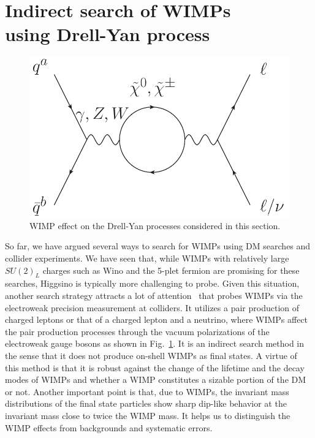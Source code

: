 \documentclass[12pt,twoside,book]{article}
\begin{document}
\section[Indirect search of WIMPs using Drell-Yan process]{
  Indirect search of WIMPs\\
  using Drell-Yan process
}
\setcounter{equation}{0}

\begin{figure}[b]
  \centering
  \includegraphics[width=0.5\hsize]{NC_CC_WIMP.pdf}
  \caption{WIMP effect on the Drell-Yan processes considered in this section.}
  \label{fig:NC_CC_WIMP}
\end{figure}

So far, we have argued several ways to search for WIMPs using DM searches and collider experiments.
We have seen that, while WIMPs with relatively large $SU(2)_L$ charges such as Wino and the 5-plet fermion are promising for these searches, Higgsino is typically more challenging to probe.
Given this situation, another search strategy attracts a lot of attention~\cite{Chigusa:2018vxz, Abe:2019egv, Alves:2014cda, Harigaya:2015yaa, Gross:2016ioi, Farina:2016rws, Matsumoto:2017vfu, DiLuzio:2018jwd, Matsumoto:2018ioi} that probes WIMPs via the electroweak precision measurement at colliders.
It utilizes a pair production of charged leptons or that of a charged lepton and a neutrino, where WIMPs affect the pair production processes through the vacuum polarizations of the electroweak gauge bosons as shown in Fig.~\ref{fig:NC_CC_WIMP}.
It is an indirect search method in the sense that it does not produce on-shell WIMPs as final states.
A virtue of this method is that it is robust against the change of the lifetime and the decay modes of WIMPs and whether a WIMP constitutes a sizable portion of the DM or not.
Another important point is that, due to WIMPs, the invariant mass distributions of the final state particles show sharp dip-like behavior at the invariant mass close to twice the WIMP mass.
It helps us to distinguish the WIMP effects from backgrounds and systematic errors.
\end{document}

